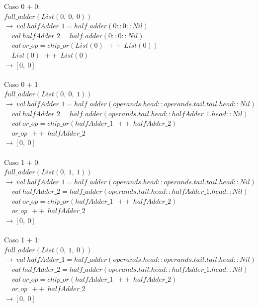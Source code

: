 \documentclass[12pt, a4paper]{article}
\begin{document}
Caso 0 + 0:\\
$full\_adder(List(0,~0,~0))$\\
$\rightarrow~val~halfAdder\_1 = half\_adder(0::0::Nil)$ \\
$~~~~~val~halfAdder\_2 = half\_adder(0::0::Nil)$ \\
$~~~~~val~or\_op = chip\_or(List(0)~~++~~List(0))$ \\
$~~~~~List(0)~~++~~List(0)$ \\
$\rightarrow [0,~0]$\\ \\
Caso 0 + 1:\\
$full\_adder(List(0,~0,~1))$\\
$\rightarrow~val~halfAdder\_1 = half\_adder(operands.head::operands.tail.tail.head::Nil)$ \\
$~~~~~val~halfAdder\_2 = half\_adder(operands.tail.head::halfAdder\_1.head::Nil)$ \\
$~~~~~val~or\_op = chip\_or(halfAdder\_1~~++~~halfAdder\_2)$ \\
$~~~~~or\_op~~++~~halfAdder\_2$ \\ 
$\rightarrow [0,~0]$\\ \\
Caso 1 + 0:\\
$full\_adder(List(0,~1,~1))$\\
$\rightarrow~val~halfAdder\_1 = half\_adder(operands.head::operands.tail.tail.head::Nil)$ \\
$~~~~~val~halfAdder\_2 = half\_adder(operands.tail.head::halfAdder\_1.head::Nil)$ \\
$~~~~~val~or\_op = chip\_or(halfAdder\_1~~++~~halfAdder\_2)$ \\
$~~~~~or\_op~~++~~halfAdder\_2$ \\ 
$\rightarrow [0,~0]$\\ \\
Caso 1 + 1:\\
$full\_adder(List(0,~1,~0))$\\
$\rightarrow~val~halfAdder\_1 = half\_adder(operands.head::operands.tail.tail.head::Nil)$ \\
$~~~~~val~halfAdder\_2 = half\_adder(operands.tail.head::halfAdder\_1.head::Nil)$ \\
$~~~~~val~or\_op = chip\_or(halfAdder\_1~~++~~halfAdder\_2)$ \\
$~~~~~or\_op~~++~~halfAdder\_2$ \\
$\rightarrow [0,~0]$\\ \\
\end{document}

